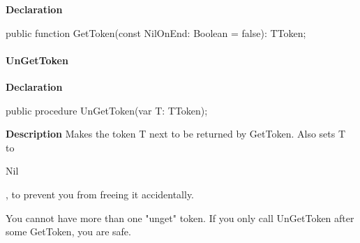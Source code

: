 \documentclass{report}
\newif\ifpdf
\begin{document}
\label{PasDoc_Tokenizer.TTokenizer-GetToken}
\begin{list}{}{
\setlength{\itemindent}{0cm}
\setlength{\listparindent}{0cm}
\setlength{\leftmargin}{\evensidemargin}
\addtolength{\leftmargin}{\tmplength}
\settowidth{\labelsep}{X}
\addtolength{\leftmargin}{\labelsep}
\setlength{\labelwidth}{\tmplength}
}
\item[\textbf{Declaration}\hfill]
\ifpdf
\begin{flushleft}
\fi
\begin{ttfamily}
public function GetToken(const NilOnEnd: Boolean = false): TToken;\end{ttfamily}

\ifpdf
\end{flushleft}
\fi

\end{list}
\paragraph*{UnGetToken}\hspace*{\fill}

\label{PasDoc_Tokenizer.TTokenizer-UnGetToken}
\begin{list}{}{
\setlength{\itemindent}{0cm}
\setlength{\listparindent}{0cm}
\setlength{\leftmargin}{\evensidemargin}
\addtolength{\leftmargin}{\tmplength}
\settowidth{\labelsep}{X}
\addtolength{\leftmargin}{\labelsep}
\setlength{\labelwidth}{\tmplength}
}
\item[\textbf{Declaration}\hfill]
\ifpdf
\begin{flushleft}
\fi
\begin{ttfamily}
public procedure UnGetToken(var T: TToken);\end{ttfamily}

\ifpdf
\end{flushleft}
\fi

\par
\item[\textbf{Description}]
Makes the token T next to be returned by GetToken. Also sets T to \begin{ttfamily}Nil\end{ttfamily}, to prevent you from freeing it accidentally.

You cannot have more than one "unget" token. If you only call UnGetToken after some GetToken, you are safe.

\end{list}
\end{document}
